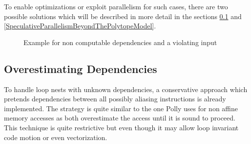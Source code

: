 To enable optimizations or exploit parallelism for such cases, 
there are two possible solutions which will be described in more detail 
in the sections \ref{OverestimatingDependencies} and 
\ref{SpeculativeParallelismBeyondThePolytopeModel}.

\lstset{frame=none}
\begin{figure}[htbp]
  \centering
  

  \label{fig:NonComputableDependencies} 
  \caption{Example for non computable dependencies and a violating input}
\end{figure}
\resetlst

\subsection{Overestimating Dependencies}
\label{OverestimatingDependencies}
To handle loop nests with unknown dependencies, a conservative approach which 
pretends dependencies between all possibly aliasing instructions is already 
implemented.
The strategy is quite similar to the one Polly uses for non 
affine memory accesses as both overestimate the access until it is sound to 
proceed. This technique is quite restrictive but even though it may allow
loop invariant code motion or even vectorization. 

